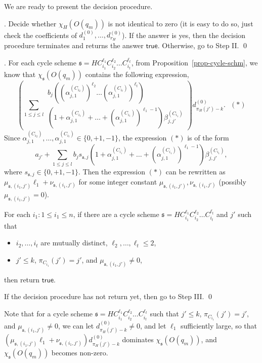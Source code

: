 \documentclass[runningheads,a4paper]{llncs}
\def\schm{{\mathfrak{s} }}
\newcommand\ltrue{\mathsf{true}}
\begin{document}
We are ready to present the decision procedure.

\smallskip

. Decide whether $\chi_H(O(q_m))$ is not identical to zero (it is easy to do so, just check the coefficients of $d^{(0)}_1, \dots, d^{(0)}_{r_H}$). If the answer is yes, then the decision procedure terminates and returns the answer $\ltrue$. Otherwise, go to Step II. \qed

\smallskip

. For each cycle scheme $\schm=HC_{i_1}^{\ell_1} C_{i_2}^{\ell_2} \dots C_{i_t}^{\ell_t}$, from Proposition~\ref{prop-cycle-schm}, we know that $\chi_{\schm}(O(q_m))$ contains the following expression,
\[
\left(\sum \limits_{1 \le j \le l} 
\begin{array}{l}
b_j \left((\alpha^{(C_{i_2})}_{j,1})^{\ell_2} \dots (\alpha^{(C_{i_t})}_{j,1})^{\ell_t}\right) \\
\left(1+\alpha^{(C_{i_1})}_{j,1} + \dots + (\alpha^{(C_{i_1})}_{j,1})^{\ell_1-1} \right) \beta^{(C_{i_1})}_{j,j'}
\end{array}
\right) d^{(0)}_{\pi_H(j')-k}. \ \ \  (\ast)
\]
Since $\alpha^{(C_{i_2})}_{j,1}, \dots, \alpha^{(C_{i_t})}_{j,1} \in \{0,+1,-1\}$, the expression $(\ast)$ is of the form 
\[
a_{j'} + \sum \limits_{1 \le j \le l} b_j  s_{\schm,j} \left(1+\alpha^{(C_{i_1})}_{j,1} + \dots +(\alpha^{(C_{i_1})}_{j,1})^{\ell_1-1} \right) \beta^{(C_{i_1})}_{j,j'},
\]
where $s_{\schm,j} \in \{0,+1,-1\}$. Then the expression $(\ast)$ can be rewritten as $\mu_{\schm, (i_1,j')} \ell_1 + \nu_{\schm, (i_1,j')}$ for some integer constant $\mu_{\schm, (i_1,j')},\nu_{\schm, (i_1,j')}$ (possibly $\mu_{\schm, (i_1,j')}=0$). 

For each $i_1: 1 \le i_1 \le n$, if there are a cycle scheme $\schm=HC_{i_1}^{\ell_1} C_{i_2}^{\ell_2} \dots C_{i_t}^{\ell_t}$  and $j'$ such that 
\begin{itemize}
\item $i_2,\dots,i_t$ are mutually distinct, $\ell_2,\dots,\ell_t \le 2$, 
%
\item $j' \le k$, $\pi_{C_{i_1}}(j')=j'$, and $\mu_{\schm,(i_1,j')} \neq 0$, 
\end{itemize}
then return $\ltrue$.

If the decision procedure has not return yet, then go to Step III. \qed

\smallskip

Note that for a cycle scheme $\schm=HC_{i_1}^{\ell_1} C_{i_2}^{\ell_2} \dots C_{i_t}^{\ell_t}$ such that $j' \le k$, $\pi_{C_{i_1}}(j')=j'$, and $\mu_{\schm,(i_1,j')} \neq 0$, we can let $d^{(0)}_{\pi_H(j')-k} \neq 0$, and let $\ell_1$ sufficiently large, so that $(\mu_{\schm,(i_1,j')} \ell_1 + \nu_{\schm,(i_1,j')})d^{(0)}_{\pi_H(j')-k}$ dominates $\chi_{\schm}(O(q_m))$, and  $\chi_{\schm}(O(q_m))$ becomes non-zero. 
\end{document}
